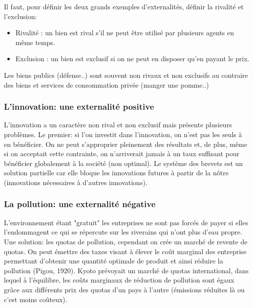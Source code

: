 Il faut, pour définir les deux grands exemples d'externalités, définir la rivalité et l'exclusion: 
\begin{itemize}
	\item Rivalité : un bien est rival s'il ne peut être utilisé par plusieurs agents en même temps.
	\item Exclusion : un bien est exclusif si on ne peut en disposer qu'en payant le prix.
\end{itemize}
Les biens publics (défense..) sont souvent non rivaux et non exclusifs au contraire des biens et services de consommation privée (manger une pomme..)

\subsubsection{L'innovation: une externalité positive} %
\label{sub:l_innovation_une_externalite_positive}

L'innovation a un caractère non rival et non exclusif mais présente plusieurs problèmes. Le premier: si l'on investit dans l'innovation, on n'est pas les seuls à en bénéficier. On ne peut s'approprier pleinement des résultats et, de plus, même si on acceptait cette contrainte, on n'arriverait jamais à un taux suffisant pour bénéficier globalement à la société (non optimal). Le système des brevets est un solution partielle car elle bloque les innovations futures à partir de la nôtre (innovations nécessaires à d'autres innovations). 

\subsubsection{La pollution: une externalité négative} %
\label{sub:la_pollution_une_externalite_negative}

L'environnement étant "gratuit" les entreprises ne sont pas forcés de payer si elles l'endommagent ce qui se répercute sur les riverains qui n'ont plus d'eau propre. Une solution: les quotas de pollution, cependant on crée un marché de revente de quotas. On peut émettre des taxes visant à élever le coût marginal des entreprise permettant d'obtenir une quantité optimale de produit et ainsi réduire la pollution (Pigou, 1920). Kyoto prévoyait un marché de quotas international, dans lequel à l'équilibre, les coûts marginaux de réduction de pollution sont égaux grâce aux différents prix des quotas d'un pays à l'autre (émissions réduites là ou c'est moins coûteux).

